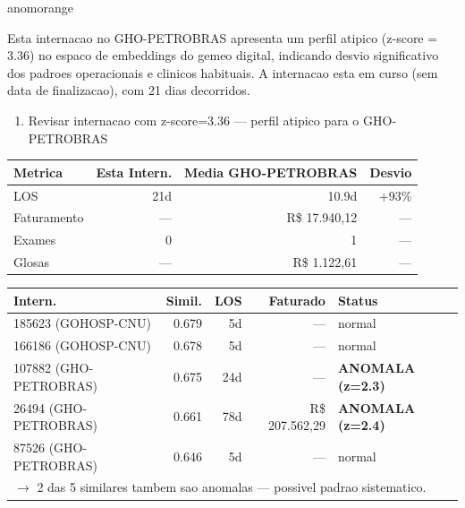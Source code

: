 \documentclass[a4paper,10pt]{article}
\begin{document}
\begin{anomalycard}[Internacao 167502 | GHO-PETROBRAS | ALTO (z=3.36)]{anomorange}
\vspace{2pt}\begin{tcolorbox}[colback=severityred!20,colframe=anomorange,title={\textbf{Interpretacao de Negocio}},fonttitle=\bfseries\small,left=4pt,right=4pt,top=3pt,bottom=3pt]
{\small Esta internacao no GHO-PETROBRAS apresenta um perfil atipico (z-score = 3.36) no espaco de embeddings do gemeo digital, indicando desvio significativo dos padroes operacionais e clinicos habituais. A internacao esta em curso (sem data de finalizacao), com 21 dias decorridos.}
\end{tcolorbox}
\begin{tcolorbox}[colback=severityyellow!30,colframe=anomorange,title={\textbf{Recomendacoes Especificas}},fonttitle=\bfseries\small,left=4pt,right=4pt,top=3pt,bottom=3pt]
\begin{enumerate}[nosep,leftmargin=16pt]
\item {\small Revisar internacao com z-score=3.36 --- perfil atipico para o GHO-PETROBRAS}
\end{enumerate}
\end{tcolorbox}
\begin{center}\begin{tabular}{l r r r}\toprule\textbf{Metrica} & \textbf{Esta Intern.} & \textbf{Media GHO-PETROBRAS} & \textbf{Desvio} \\\midrule
LOS & 21d & 10.9d & \textcolor{anomorange}{+93\%} \\
Faturamento & --- & R\$ 17.940,12 & --- \\
Exames & 0 & 1 & --- \\
Glosas & --- & R\$ 1.122,61 & --- \\
\bottomrule\end{tabular}\end{center}

\begin{tabular}{l r r r l}\toprule\textbf{Intern.} & \textbf{Simil.} & \textbf{LOS} & \textbf{Faturado} & \textbf{Status} \\\midrule
185623 (GOHOSP-CNU) & 0.679 & 5d & --- & \textcolor{jcubeblue}{normal} \\
166186 (GOHOSP-CNU) & 0.678 & 5d & --- & \textcolor{jcubeblue}{normal} \\
107882 (GHO-PETROBRAS) & 0.675 & 24d & --- & \textcolor{anomred}{\textbf{ANOMALA (z=2.3)}} \\
26494 (GHO-PETROBRAS) & 0.661 & 78d & R\$ 207.562,29 & \textcolor{anomred}{\textbf{ANOMALA (z=2.4)}} \\
87526 (GHO-PETROBRAS) & 0.646 & 5d & --- & \textcolor{jcubeblue}{normal} \\
\multicolumn{5}{l}{\textcolor{anomred}{\small $\rightarrow$ 2 das 5 similares tambem sao anomalas --- possivel padrao sistematico.}} \\
\bottomrule\end{tabular}


\end{anomalycard}
\end{document}
